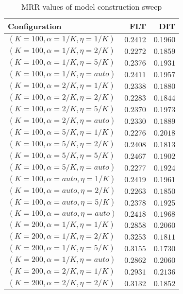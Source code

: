 
\begin{table}
\begin{spacing}{1.2}
\centering
\caption{MRR values of \pig model construction sweep}
\label{table:pig_model_sweep}
\vspace{0.2em}
\parbox{.45\linewidth}{\centering \begin{tabular}{lrr}
\toprule
                   Configuration &      FLT &      DIT \\
\midrule
   $(K=100,\alpha=1/K,\eta=1/K)$ & $0.2412$ & $0.1960$ \\
   $(K=100,\alpha=1/K,\eta=2/K)$ & $0.2272$ & $0.1859$ \\
   $(K=100,\alpha=1/K,\eta=5/K)$ & $0.2376$ & $0.1931$ \\
  $(K=100,\alpha=1/K,\eta=auto)$ & $0.2411$ & $0.1957$ \\
   $(K=100,\alpha=2/K,\eta=1/K)$ & $0.2338$ & $0.1880$ \\
   $(K=100,\alpha=2/K,\eta=2/K)$ & $0.2283$ & $0.1844$ \\
   $(K=100,\alpha=2/K,\eta=5/K)$ & $0.2370$ & $0.1973$ \\
  $(K=100,\alpha=2/K,\eta=auto)$ & $0.2330$ & $0.1889$ \\
   $(K=100,\alpha=5/K,\eta=1/K)$ & $0.2276$ & $0.2018$ \\
   $(K=100,\alpha=5/K,\eta=2/K)$ & $0.2408$ & $0.1813$ \\
   $(K=100,\alpha=5/K,\eta=5/K)$ & $0.2467$ & $0.1902$ \\
  $(K=100,\alpha=5/K,\eta=auto)$ & $0.2277$ & $0.1924$ \\
  $(K=100,\alpha=auto,\eta=1/K)$ & $0.2419$ & $0.1961$ \\
  $(K=100,\alpha=auto,\eta=2/K)$ & $0.2263$ & $0.1850$ \\
  $(K=100,\alpha=auto,\eta=5/K)$ & $0.2378$ & $0.1925$ \\
 $(K=100,\alpha=auto,\eta=auto)$ & $0.2418$ & $0.1968$ \\
   $(K=200,\alpha=1/K,\eta=1/K)$ & $0.2858$ & $0.2060$ \\
   $(K=200,\alpha=1/K,\eta=2/K)$ & $0.3253$ & $0.1811$ \\
   $(K=200,\alpha=1/K,\eta=5/K)$ & $0.3155$ & $0.1730$ \\
  $(K=200,\alpha=1/K,\eta=auto)$ & $0.2862$ & $0.2060$ \\
   $(K=200,\alpha=2/K,\eta=1/K)$ & $0.2931$ & $0.2136$ \\
   $(K=200,\alpha=2/K,\eta=2/K)$ & $0.3132$ & $0.1852$ \\

\end{tabular}}
\end{spacing}
\end{table}
